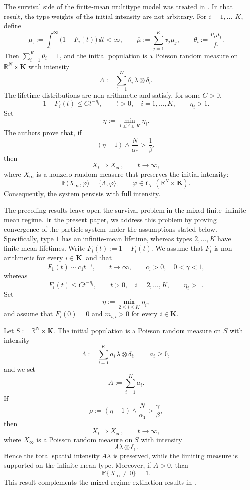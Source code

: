 \documentclass[reqno,final,11pt]{amsart}
\newcommand{\R}{\mathbb R}
\newcommand{\E}{\mathbb E}
\newcommand{\Pbb}{\mathbb P}
\newcommand{\Kk}{\mathbf K}
\newcommand{\ip}[2]{\langle #1,#2\rangle}
\theoremstyle{plain}
\theoremstyle{definition}
\theoremstyle{remark}
\numberwithin{equation}{section}
\begin{document}
The survival side of the finite-mean multitype model was treated in \cite{KLRFiniteMean}. In that result, the type weights of the initial intensity are not arbitrary. For \(i=1,\dots,K\), define
\[
  \mu_i:=\int_0^\infty\bigl(1-F_i(t)\bigr)\,dt<\infty,
  \qquad
  \overline\mu:=\sum_{j=1}^K v_j\mu_j,
  \qquad
  \theta_i:=\frac{v_i\mu_i}{\overline\mu}.
\]
Then \(\sum_{i=1}^K\theta_i=1\), and the initial population is a Poisson random measure on \(\R^N\times\Kk\) with intensity
\[
  \overline\Lambda
  :=\sum_{i=1}^K\theta_i\,\lambda\otimes\delta_i.
\]
The lifetime distributions are non-arithmetic and satisfy, for some \(C>0\),
\[
  1-F_i(t)\le Ct^{-\eta_i},
  \qquad t>0,\quad i=1,\dots,K,
  \qquad \eta_i>1.
\]
Set
\[
  \eta:=\min_{1\le i\le K}\eta_i.
\]
The authors prove that, if
\[
  (\eta-1)\wedge\frac{N}{\alpha_*}>\frac1\beta,
\]
then
\[
  X_t\Rightarrow X_\infty,\qquad t\to\infty,
\]
where \(X_\infty\) is a nonzero random measure that preserves the initial intensity:
\[
  \E\ip{X_\infty}{\varphi}
  =\ip{\overline\Lambda}{\varphi},
  \qquad
  \varphi\in C_c^+(\R^N\times\Kk).
\]
Consequently, the system persists with full intensity.




The preceding results leave open the survival problem in the mixed finite--infinite mean regime. In the present paper, we address this problem by proving convergence of the particle system under the assumptions stated below. Specifically, type \(1\) has an infinite-mean lifetime, whereas types \(2,\dots,K\) have finite-mean lifetimes. Write \(\overline F_i(t):=1-F_i(t)\). We assume that \(F_i\) is non-arithmetic for every \(i\in\Kk\), and that
\[
  \overline F_1(t)\sim c_1t^{-\gamma},
  \qquad t\to\infty,
  \qquad c_1>0,\quad 0<\gamma<1,
\]
whereas
\[
  \overline F_i(t)\le Ct^{-\eta_i},
  \qquad t>0,\quad i=2,\dots,K,
  \qquad \eta_i>1.
\]
Set
\[
  \eta:=\min_{2\le i\le K}\eta_i,
\]
and assume that \(F_i(0)=0\) and \(m_{i,i}>0\) for every \(i\in\Kk\).

Let \(S:=\R^N\times\Kk\). The initial population is a Poisson random measure on \(S\) with intensity
\[
  \Lambda:=\sum_{i=1}^K a_i\,\lambda\otimes\delta_i,
  \qquad a_i\ge0,
\]
and we set
\[
  A:=\sum_{i=1}^K a_i.
\]
If
\[
  \rho:=\left(\eta-1\right)\wedge\frac{N}{\alpha_1}
  >
  \frac{\gamma}{\beta},
\]
then
\[
  X_t\Rightarrow X_\infty,
  \qquad t\to\infty,
\]
where \(X_\infty\) is a Poisson random measure on \(S\) with intensity
\[
  A\lambda\otimes\delta_1.
\]
Hence the total spatial intensity \(A\lambda\) is preserved, while the limiting measure is supported on the infinite-mean type. Moreover, if \(A>0\), then
\[
  \Pbb\{X_\infty\ne0\}=1.
\]
This result complements the mixed-regime extinction results in \cite{Kevei}.
\end{document}

